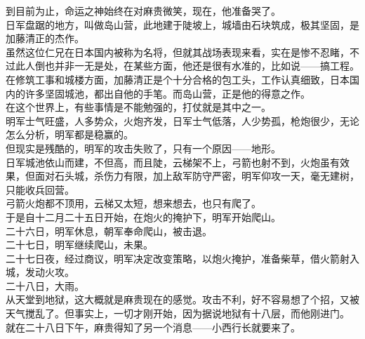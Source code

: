 \begin{multicols}{\theparacolNo}
到目前为止，命运之神始终在对麻贵微笑，现在，他准备哭了。\\

日军盘踞的地方，叫做岛山营，此地建于陡坡上，城墙由石块筑成，极其坚固，是加藤清正的杰作。\\

虽然这位仁兄在日本国内被称为名将，但就其战场表现来看，实在是惨不忍睹，不过此人倒也并非一无是处，在某些方面，他还是很有水准的，比如说——搞工程。\\

在修筑工事和城楼方面，加藤清正是个十分合格的包工头，工作认真细致，日本国内的许多坚固城池，都出自他的手笔。而岛山营，正是他的得意之作。\\

在这个世界上，有些事情是不能勉强的，打仗就是其中之一。\\

明军士气旺盛，人多势众，火炮齐发，日军士气低落，人少势孤，枪炮很少，无论怎么分析，明军都是稳赢的。\\

但现实是残酷的，明军的攻击失败了，只有一个原因——地形。\\

日军城池依山而建，不但高，而且陡，云梯架不上，弓箭也射不到，火炮虽有效果，但面对石头城，杀伤力有限，加上敌军防守严密，明军仰攻一天，毫无建树，只能收兵回营。\\

弓箭火炮都不顶用，云梯又太短，想来想去，也只有爬了。\\

于是自十二月二十五日开始，在炮火的掩护下，明军开始爬山。\\

二十六日，明军休息，朝军奉命爬山，被击退。\\

二十七日，明军继续爬山，未果。\\

二十七日夜，经过商议，明军决定改变策略，以炮火掩护，准备柴草，借火箭射入城，发动火攻。\\

二十八日，大雨。\\

从天堂到地狱，这大概就是麻贵现在的感觉。攻击不利，好不容易想了个招，又被天气搅乱了。但事实上，一切才刚开始，因为据说地狱有十八层，而他刚进门。\\

就在二十八日下午，麻贵得知了另一个消息——小西行长就要来了。\\


\end{multicols}
